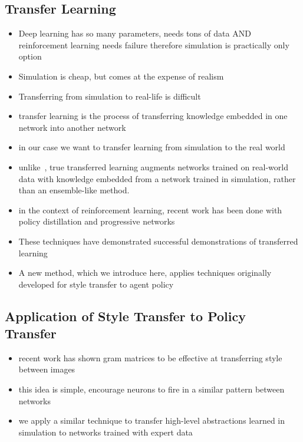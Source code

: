 \documentclass[paper=a4, fontsize=11pt]{scrartcl} %
\begin{document}
	\subsection{Transfer Learning}
	\begin{itemize}
		\item Deep learning has so many parameters, needs tons of data AND reinforcement learning needs failure therefore simulation is practically only option
		\item Simulation is cheap, but comes at the expense of realism
		\item Transferring from simulation to real-life is difficult
		\item transfer learning is the process of transferring knowledge embedded in one network into another network
		\item in our case we want to transfer learning from simulation to the real world
		\item unlike~\cite{Michels2005}, true transferred learning augments networks trained on real-world data with knowledge embedded from a network trained in simulation, rather than an ensemble-like method.
		\item in the context of reinforcement learning, recent work has been done with policy distillation \cite{Rusu2015} and progressive networks \cite{Rusu2016}
		\item These techniques have demonstrated successful demonstrations of transferred learning
		\item A new method, which we introduce here, applies techniques originally developed for style transfer to agent policy~\cite{Gatys2015}
	\end{itemize}

	\subsection{Application of Style Transfer to Policy Transfer}
	\begin{itemize}
		\item recent work has shown gram matrices to be effective at transferring style between images \cite{Gatys2015}
		\item this idea is simple, encourage neurons to fire in a similar pattern between networks
		\item we apply a similar technique to transfer high-level abstractions learned in simulation to networks trained with expert data
	\end{itemize}
\end{document}
